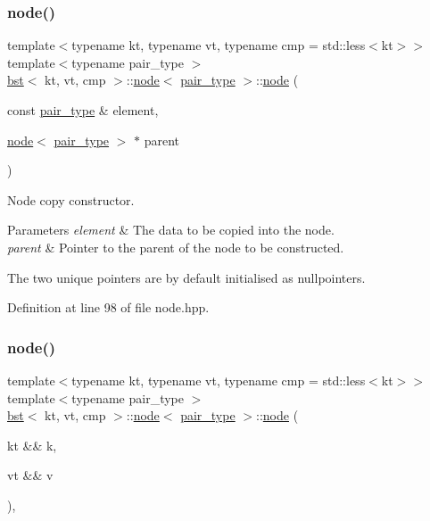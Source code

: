 \subsubsection{\texorpdfstring{node()}{node()}\hspace{0.1cm}{\footnotesize\ttfamily [4/5]}}
{\footnotesize\ttfamily template$<$typename kt, typename vt, typename cmp = std\+::less$<$kt$>$$>$ \\
template$<$typename pair\+\_\+type $>$ \\
\hyperlink{classbst}{bst}$<$ kt, vt, cmp $>$\+::\hyperlink{structbst_1_1node}{node}$<$ \hyperlink{classbst_a7b11cca2a3b4394915600194f741ab16}{pair\+\_\+type} $>$\+::\hyperlink{structbst_1_1node}{node} (\begin{DoxyParamCaption}\item[{const \hyperlink{classbst_a7b11cca2a3b4394915600194f741ab16}{pair\+\_\+type} \&}]{element,  }\item[{\hyperlink{structbst_1_1node}{node}$<$ \hyperlink{classbst_a7b11cca2a3b4394915600194f741ab16}{pair\+\_\+type} $>$ $\ast$}]{parent }\end{DoxyParamCaption})\hspace{0.3cm}{\ttfamily [inline]}}



Node copy constructor. 


\begin{DoxyParams}{Parameters}
{\em element} & The data to be copied into the node. \\
\hline
{\em parent} & Pointer to the parent of the node to be constructed.\\
\hline
\end{DoxyParams}
The two unique pointers are by default initialised as nullpointers. 

Definition at line 98 of file node.\+hpp.

\mbox{\label{structbst_1_1node_a16fb9a6092d387f08864f4c75ca312bb}} 
\subsubsection{\texorpdfstring{node()}{node()}\hspace{0.1cm}{\footnotesize\ttfamily [5/5]}}
{\footnotesize\ttfamily template$<$typename kt, typename vt, typename cmp = std\+::less$<$kt$>$$>$ \\
template$<$typename pair\+\_\+type $>$ \\
\hyperlink{classbst}{bst}$<$ kt, vt, cmp $>$\+::\hyperlink{structbst_1_1node}{node}$<$ \hyperlink{classbst_a7b11cca2a3b4394915600194f741ab16}{pair\+\_\+type} $>$\+::\hyperlink{structbst_1_1node}{node} (\begin{DoxyParamCaption}\item[{kt \&\&}]{k,  }\item[{vt \&\&}]{v }\end{DoxyParamCaption})\hspace{0.3cm}{\ttfamily [inline]}, {\ttfamily [noexcept]}}



